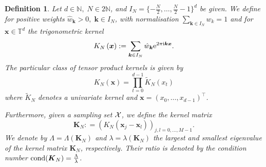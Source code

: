 \documentclass[11pt,a4paper,bibtotoc]{scrartcl}
\def\N{\mathbb{N}}
\def\T{\mathbb{T}}
\def\ti{\mbox{\scriptsize{\rm i}}}
\newcommand{\eip}[1]{{\rm e}^{ 2\pi{\ti} #1}}
\newcommand{\zb}[1]{\ensuremath{\boldsymbol{#1}}}
\newcommand{\cond}{{\rm cond}}
\newcommand{\indexset}{{I_N}}
\newtheorem{definition}[theorem]{Definition}
\newenvironment{Definition}{\goodbreak \begin{definition}\rm}{\end{definition}}
\numberwithin{equation}{section}
\numberwithin{table}{section}
\numberwithin{figure}{section}
\begin{document}
\begin{Definition}  \label{def:kernel}
  Let $d\in\N,\;N\in 2\N$, and $I_N=\{-\frac{N}{2},\hdots,\frac{N}{2}-1\}^d$
  be given. 
  We define for positive weights $\hat w_{\zb k}>0,\; \zb k \in
  \indexset$, with normalisation $\sum_{\zb k\in I_N} w_k=1$ and for $\zb x
  \in \T^d$ the trigonometric {\em kernel}
  \begin{equation*}
    K_N \left(\zb x\right):=\sum\limits_{\zb k \in \indexset} \hat w_{\zb k}
    \eip{\zb k \zb x}.
  \end{equation*}
  The particular class of {\em tensor product kernels} is given by
  \begin{equation*}
    K_N\left(\zb x\right)=\prod\limits_{t=0}^{d-1}
    \tilde K_N\left(x_t\right)
  \end{equation*}
  where $\tilde K_N$ denotes a univariate kernel and $\zb
  x=(x_0,\hdots,x_{d-1})^{\top}$.

  Furthermore, given a sampling set ${\cal X}$, we define the {\em kernel
  matrix}
  \begin{equation*}
    \zb K_N: = \left(K_N (\zb x_j-\zb x_l) \right)_{j,l=0,\ldots,M-1}.
  \end{equation*}
  We denote by $\Lambda=\Lambda\left(\zb K_N\right)$ and
  $\lambda=\lambda\left(\zb K_N\right)$ the largest and smallest eigenvalue of 
  the kernel matrix $\zb K_N$, respectively.
  Their ratio is denoted by the condition number $\cond(\zb K_N)=
  \frac{\Lambda}{\lambda}$.
\end{Definition}
\end{document}
